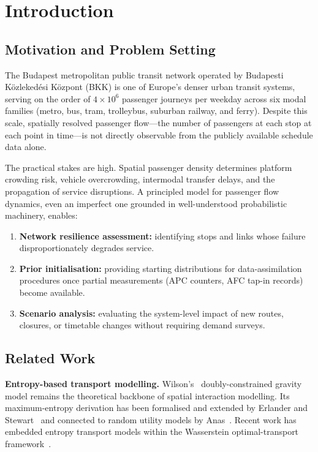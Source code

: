 \documentclass[12pt,a4paper]{article}
\theoremstyle{plain}
\theoremstyle{definition}
\theoremstyle{remark}
\begin{document}
\section{Introduction}
\label{sec:intro}

\subsection{Motivation and Problem Setting}

The Budapest metropolitan public transit network operated by Budapesti
K\"{o}zleked\'{e}si K\"{o}zpont (BKK) is one of Europe's denser urban transit
systems, serving on the order of $4\times10^6$ passenger journeys per weekday
across six modal families (metro, bus, tram, trolleybus, suburban railway, and
ferry).  Despite this scale, spatially resolved passenger flow---the number of
passengers at each stop at each point in time---is not directly observable from
the publicly available schedule data alone.

The practical stakes are high.  Spatial passenger density determines platform
crowding risk, vehicle overcrowding, intermodal transfer delays, and the
propagation of service disruptions.  A principled model for passenger flow
dynamics, even an imperfect one grounded in well-understood probabilistic
machinery, enables:
\begin{enumerate}
  \item \textbf{Network resilience assessment:} identifying stops and links
    whose failure disproportionately degrades service.
  \item \textbf{Prior initialisation:} providing starting distributions for
    data-assimilation procedures once partial measurements (APC counters, AFC
    tap-in records) become available.
  \item \textbf{Scenario analysis:} evaluating the system-level impact of new
    routes, closures, or timetable changes without requiring demand surveys.
\end{enumerate}

\subsection{Related Work}

\textbf{Entropy-based transport modelling.}
Wilson's~\citep{wilson1969} doubly-constrained gravity model remains the
theoretical backbone of spatial interaction modelling.  Its maximum-entropy
derivation has been formalised and extended by Erlander and
Stewart~\citep{erlander1990} and connected to random utility models by
Anas~\citep{anas1983}.  Recent work has embedded entropy transport models within
the Wasserstein optimal-transport framework~\citep{peyre2019}.
\end{document}
